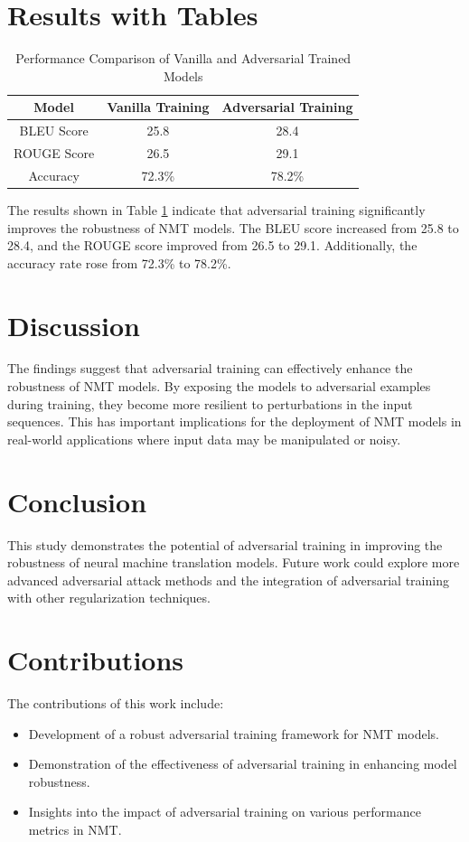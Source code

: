 \documentclass{article}
\begin{document}
\section{Results with Tables}
\begin{table}[ht]
    \centering
    \begin{tabular}{|c|c|c|}
        \hline
        Model & Vanilla Training & Adversarial Training \\
        \hline
        BLEU Score & 25.8 & 28.4 \\
        \hline
        ROUGE Score & 26.5 & 29.1 \\
        \hline
        Accuracy & 72.3\% & 78.2\% \\
        \hline
    \end{tabular}
    \caption{Performance Comparison of Vanilla and Adversarial Trained Models}
    \label{tab:results}
\end{table}

The results shown in Table \ref{tab:results} indicate that adversarial training significantly improves the robustness of NMT models. The BLEU score increased from 25.8 to 28.4, and the ROUGE score improved from 26.5 to 29.1. Additionally, the accuracy rate rose from 72.3\% to 78.2\%.

\section{Discussion}
The findings suggest that adversarial training can effectively enhance the robustness of NMT models. By exposing the models to adversarial examples during training, they become more resilient to perturbations in the input sequences. This has important implications for the deployment of NMT models in real-world applications where input data may be manipulated or noisy.

\section{Conclusion}
This study demonstrates the potential of adversarial training in improving the robustness of neural machine translation models. Future work could explore more advanced adversarial attack methods and the integration of adversarial training with other regularization techniques.

\section{Contributions}
The contributions of this work include:
\begin{itemize}
    \item Development of a robust adversarial training framework for NMT models.
    \item Demonstration of the effectiveness of adversarial training in enhancing model robustness.
    \item Insights into the impact of adversarial training on various performance metrics in NMT.
\end{itemize}



\end{document}
